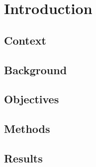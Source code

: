 \section{Introduction}

\subsection{Context}

\subsection{Background}

\subsection{Objectives}

\subsection{Methods}

\subsection{Results}
